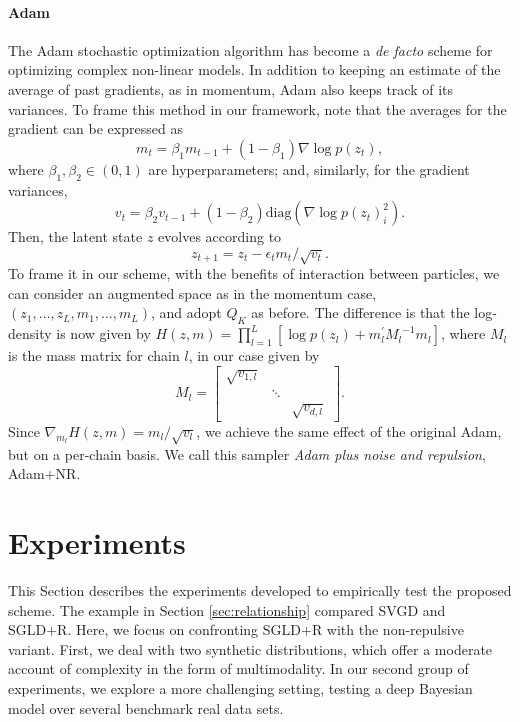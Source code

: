 \paragraph{Adam} The Adam stochastic optimization algorithm has become a \emph{de facto} scheme for optimizing complex non-linear models. In addition to keeping an estimate of the average of past gradients, as in momentum, Adam also keeps track of its variances.
To frame this method in our framework, note that the averages for the gradient can be expressed as
$$
{m}_t = \beta_1 {m}_{t-1} + (1 - \beta_1) \nabla \log p ({z}_t),
$$
where $\beta_1, \beta_2 \in (0, 1)$ are hyperparameters; and, similarly, for the gradient variances,
$$
{v}_t = \beta_2 {v}_{t-1} + (1 - \beta_2) \mbox{diag}(\nabla \log p ({z}_t)_i^2).
$$
Then, the latent state ${z}$ evolves according to
$$
{z}_{t+1} = {z}_t - \epsilon_t {m}_t / \sqrt{{v}_t}.
$$
To frame it in our scheme, with the benefits of interaction between particles, we can consider an augmented space as in the momentum case, $({z}_1, \ldots, {z}_L, {m}_1, \ldots, {m}_L)$, and adopt ${Q_K}$ as before. The difference is that the log-density is now given by $H({z}, {m}) = \prod_{l=1} ^L \left[ \log p({z}_l) + {m}_l^{'} {M_l}^{-1} {m}_l \right]$, where ${M_l}$ is the mass matrix for chain $l$, in our case given by
$$
{M_l} = 
\begin{bmatrix}
\sqrt{v_{1,l}} & & \\
 & \ddots & \\
  & & \sqrt{v_{d,l}} 
\end{bmatrix}.
$$
Since $\nabla_{{m}_l} H({z},{m}) = {m}_l / \sqrt{{v}_l}$, we achieve the same effect of the original Adam, but on a per-chain basis. We call this sampler \emph{Adam plus noise and repulsion}, Adam+NR.





\section{Experiments}\label{sec:experiments_sgmcmc}

This Section describes the experiments developed to empirically test the proposed scheme. The example in Section \ref{sec:relationship} compared SVGD and SGLD+R. Here, we focus on confronting SGLD+R with the non-repulsive variant. First, we deal with two synthetic distributions, which offer a moderate account of complexity in the form of multimodality. In our second group of experiments, we explore a more challenging setting, testing a deep Bayesian model over several benchmark real data sets. 

